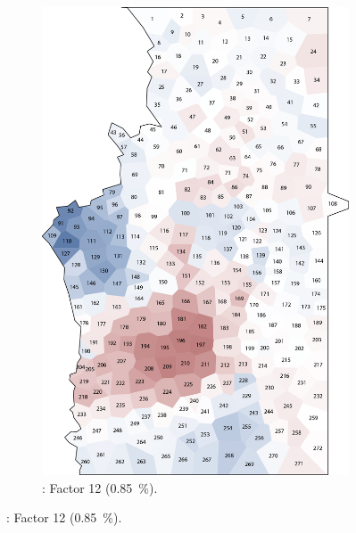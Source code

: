 \documentclass[output=paper]{LSP/langsci}
\begin{document}
\begin{figure}
\begin{subfigure}[t]{0.3\textwidth}
\includegraphics[width=\textwidth]{illustrations/pickl_fig14}
\caption{: Factor 12 (0.85~\%).}
\label{fig:14}
\end{subfigure}

\vskip11pt


\end{figure}
\end{document}

